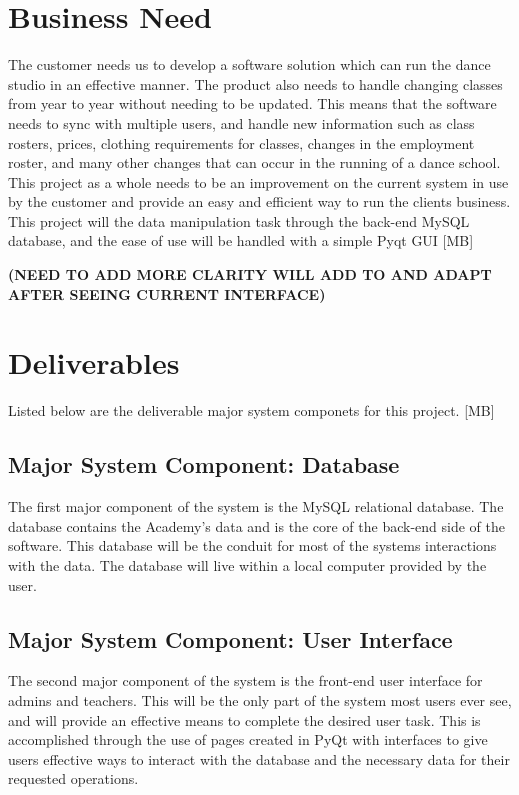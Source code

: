 \section{Business Need}
The customer needs us to develop a software solution which can run the dance studio in an effective manner. The product also needs to handle changing classes from year to year without needing to be updated. This means that the software needs to sync with multiple users, and handle new information such as class rosters, prices, clothing requirements for classes, changes in the employment roster, and many other changes that can occur in the running of a dance school.\\
This project as a whole needs to be an improvement on the current system in use by the customer and provide an easy and efficient way to run the clients business. This project will  the data manipulation task through the back-end MySQL database, and the ease of use will be handled with a simple Pyqt GUI [MB]

\bf(NEED TO ADD MORE CLARITY WILL ADD TO AND ADAPT AFTER SEEING CURRENT INTERFACE)
   

\section{Deliverables} 
Listed below are the deliverable major system componets for this project. [MB]

\subsection{Major System Component: Database}
The first major component of the system is the MySQL relational database. The database contains the Academy's data and is the core of the back-end side of the software. This database will be the conduit for most of the systems interactions with the data. The database will live within a local computer provided by the user.  

\subsection{Major System Component: User Interface}
The second major component of the system is the front-end user interface for admins and teachers. This will be the only part of the system most users ever see, and will provide an effective means to complete the desired user task. This is accomplished through the use of pages created in PyQt with interfaces to give users effective ways to interact with the database and the necessary data for their requested operations.

